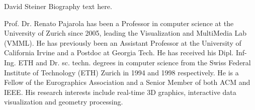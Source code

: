 \documentclass[10pt,journal,compsoc]{IEEEtran}
\begin{document}
\begin{IEEEbiographynophoto}{David Steiner}
Biography text here.
\end{IEEEbiographynophoto}


\begin{IEEEbiography}{Prof. Dr. Renato Pajarola}
has been a Professor in computer science at the University of Zurich since 2005, leading the Visualization and MultiMedia Lab (VMML). He has previously been an Assistant Professor at the University of California Irvine and a Postdoc at Georgia Tech. He has received his Dipl. Inf-Ing. ETH and Dr. sc. techn. degrees in computer science from the Swiss Federal Institute of Technology (ETH) Zurich in 1994 and 1998 respectively. He is a Fellow of the Eurographics Association and a Senior Member of both ACM and IEEE. His research interests include real-time 3D graphics, interactive data visualization and geometry processing.
\end{IEEEbiography}



\end{document}
